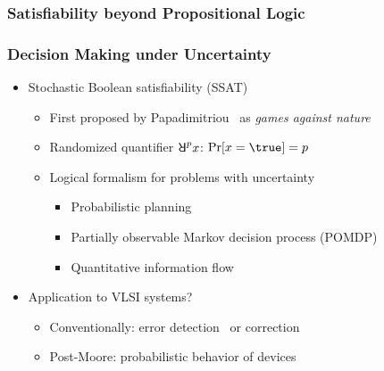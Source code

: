 \begin{frame}
      \frametitle{Satisfiability beyond Propositional Logic}
      \begin{figure}
            \centering
            
      \end{figure}
\end{frame}

\begin{frame}
      \frametitle{Decision Making under Uncertainty}
      \begin{itemize}
            \item Stochastic Boolean satisfiability (SSAT)
                  \begin{itemize}
                        \item First proposed by Papadimitriou~\cite{Papadimitriou1985} as \emph{games against nature}
                        \item Randomized quantifier $\random{p}x$: $\spb{x=\true}=p$
                        \item Logical formalism for problems with uncertainty
                              \begin{itemize}
                                    \item Probabilistic planning~\cite{Majercik1998,
                                                Majercik2003,
                                                Majercik2005}
                                    \item Partially observable Markov decision process (POMDP)~\cite{Salmon2020}
                                    \item Quantitative information flow~\cite{Fremont2017}
                              \end{itemize}
                  \end{itemize}
                  \pause
            \item Application to VLSI systems?
                  \begin{itemize}
                        \item Conventionally: error detection~\cite{Constantinescu2003} or correction~\cite{Mitra2006}
                        \item Post-Moore: probabilistic behavior of devices~\cite{Chakrapani2006ProbDesign}
                  \end{itemize}
      \end{itemize}
\end{frame}

